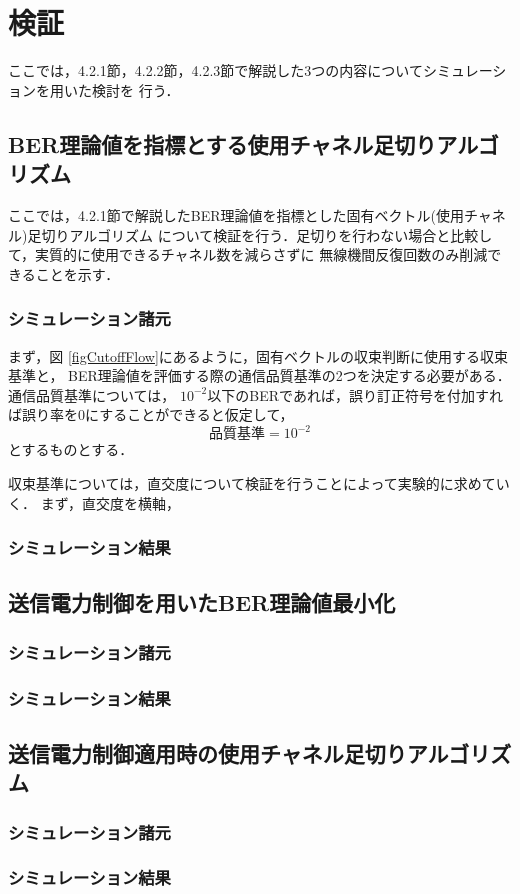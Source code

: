 \section{検証}
ここでは，4.2.1節，4.2.2節，4.2.3節で解説した3つの内容についてシミュレーションを用いた検討を
行う．

\subsection{BER理論値を指標とする使用チャネル足切りアルゴリズム}
ここでは，4.2.1節で解説したBER理論値を指標とした固有ベクトル(使用チャネル)足切りアルゴリズム
について検証を行う．足切りを行わない場合と比較して，実質的に使用できるチャネル数を減らさずに
無線機間反復回数のみ削減できることを示す．

\subsubsection{シミュレーション諸元}
まず，図 \ref{figCutoffFlow}にあるように，固有ベクトルの収束判断に使用する収束基準と，
BER理論値を評価する際の通信品質基準の2つを決定する必要がある．通信品質基準については，
$10^{-2}$以下のBERであれば，誤り訂正符号を付加すれば誤り率を0にすることができると仮定して，
\begin{equation}
    品質基準=10^{-2}
\end{equation}
とするものとする．

収束基準については，直交度について検証を行うことによって実験的に求めていく．
まず，直交度を横軸，


\subsubsection{シミュレーション結果}
\subsection{送信電力制御を用いたBER理論値最小化}
\subsubsection{シミュレーション諸元}
\subsubsection{シミュレーション結果}
\subsection{送信電力制御適用時の使用チャネル足切りアルゴリズム}
\subsubsection{シミュレーション諸元}
\subsubsection{シミュレーション結果}
